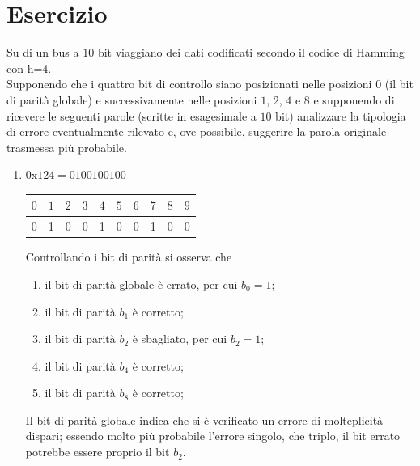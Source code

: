 \documentclass[a4paper]{extarticle}
\renewcommand\arraystretch{}
\begin{document}
\section{Esercizio}
Su di un bus a $10$ bit viaggiano dei dati codificati secondo il codice di Hamming con h=4.\\
Supponendo che i quattro bit di controllo siano posizionati nelle posizioni $0$ (il bit di parità globale) e successivamente nelle posizioni $1$, $2$, $4$ e $8$ e supponendo di ricevere le seguenti parole (scritte in esagesimale a $10$ bit) analizzare la tipologia di errore eventualmente rilevato e, ove possibile, suggerire la parola originale trasmessa più probabile.
\begin{enumerate}
    \item $0$x$124 = 01 0010 0100$

    \noindent
    \begin{table}[H]
    \setlength{\tabcolsep}{4pt}
    \renewcommand{\arraystretch}{1}
    \centering
    \begin{tabular}{|c|c|c|c|c|c|c|c|c|c|}
        \hline
        $0$ & $1$ & $2$ & $3$ & $4$ & $5$ & $6$ & $7$ & $8$ & $9$\\
        \hline
        \cellcolor{orange!75!white}0 & \cellcolor{orange!25!white}1 &\cellcolor{orange!25!white}0 & 0 & \cellcolor{orange!25!white}1 & 0 & 0 & 1 & \cellcolor{orange!25!white}0 & 0\\
        \hline
    \end{tabular}
    \end{table}

    \vspace{1em}
    \noindent
    Controllando i bit di parità si osserva che
    \begin{enumerate}
        \item il bit di parità globale è errato, per cui $b_0=1$;
        \item il bit di parità $b_1$ è corretto;
        \item il bit di parità $b_2$ è sbagliato, per cui $b_2=1$;
        \item il bit di parità $b_4$ è corretto;
        \item il bit di parità $b_8$ è corretto; 
    \end{enumerate}
    Il bit di parità globale indica che si è verificato un errore di molteplicità dispari; essendo molto più probabile l'errore singolo, che triplo, il bit errato potrebbe essere proprio il bit $b_2$.


\end{enumerate}
\end{document}
